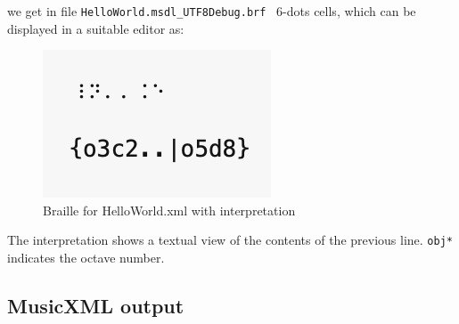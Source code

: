 we get in file {\tt HelloWorld.msdl_UTF8Debug.brf} \braille\ 6-dots cells, which can be displayed in a suitable editor as:
\begin{figure}[htbp]
\begin{center}
\includegraphics{../graphics/BrailleForHelloWorld.xmlWithInterpretation.png}

\caption{Braille for HelloWorld.xml with interpretation}
\label{Braille for HelloWorld.xml with interpretation}
\end{center}
\end{figure}

The interpretation shows a textual view of the contents of the previous line. {\tt obj*} indicates the octave number.

\subsection{MusicXML output}

